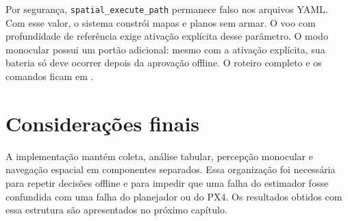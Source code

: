 Por segurança, \texttt{spatial\_execute\_path} permanece falso nos arquivos YAML. Com esse valor, o sistema constrói mapas e planos sem armar. O voo com profundidade de referência exige ativação explícita desse parâmetro. O modo monocular possui um portão adicional: mesmo com a ativação explícita, sua bateria só deve ocorrer depois da aprovação offline. O roteiro completo e os comandos ficam em .

\section{Considerações finais}

A implementação mantém coleta, análise tabular, percepção monocular e navegação espacial em componentes separados. Essa organização foi necessária para repetir decisões offline e para impedir que uma falha do estimador fosse confundida com uma falha do planejador ou do PX4. Os resultados obtidos com essa estrutura são apresentados no próximo capítulo.

